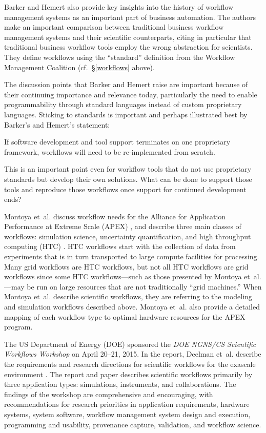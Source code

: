 Barker and Hemert also provide key insights into the history of workflow
management systems as an important part of business automation. The authors make
an important comparison between traditional business workflow management systems
and their scientific counterparts, citing in particular that traditional
business workflow tools employ the wrong abstraction for scientists. They define
workflows using the ``standard'' definition from the Workflow Management
Coalition (cf.~\S \ref{workflows} above).

The discussion points that Barker and Hemert raise are important because of
their continuing importance and relevance today, particularly the need to enable
programmability through standard languages instead of custom proprietary
languages. Sticking to standards is important and perhaps illustrated best
by Barker's and Hemert's statement:

\begin{displayquote} If software development and tool support terminates on one
proprietary framework, workflows will need to be re-implemented from scratch.
\end{displayquote}

This is an important point even for workflow tools that do not use proprietary
standards but develop their own solutions. What can be done to support those
tools and reproduce those workflows once support for continued development ends?

Montoya et~al. discuss workflow needs for the Alliance for Application
Performance at Extreme Scale (APEX) \cite{nersc_apex_2016}, and describe three
main classes of workflows: simulation science, uncertainty quantification,
and high throughput computing (HTC) \cite{montoya_apex_2016}.  HTC workflows
start with the collection of data from experiments that is in turn transported
to large compute facilities for processing. Many grid workflows are HTC
workflows, but not all HTC workflows are grid workflows since some HTC workflows---such as those presented by Montoya et~al.---may be run on large
resources that are not traditionally ``grid machines.'' When Montoya et~al.
describe scientific workflows, they are referring to the modeling and simulation
workflows described above. Montoya et~al. also provide a detailed mapping of
each workflow type to optimal hardware resources for the APEX program.

The US Department of Energy (DOE) sponsored the \emph{DOE NGNS/CS Scientific
Workflows Workshop} on April 20--21, 2015. In the report, Deelman et~al.
describe the requirements and research directions for scientific workflows for
the exascale environment \cite{deelman_future_2015}\cite{deelman_future_2017}.
The report and paper describes scientific workflows primarily by three
application types: simulations, instruments, and collaborations. The findings of
the workshop are comprehensive and encouraging, with recommendations for
research priorities in application requirements, hardware systems, system
software, workflow management system design and execution, programming and
usability, provenance capture, validation, and workflow science.

